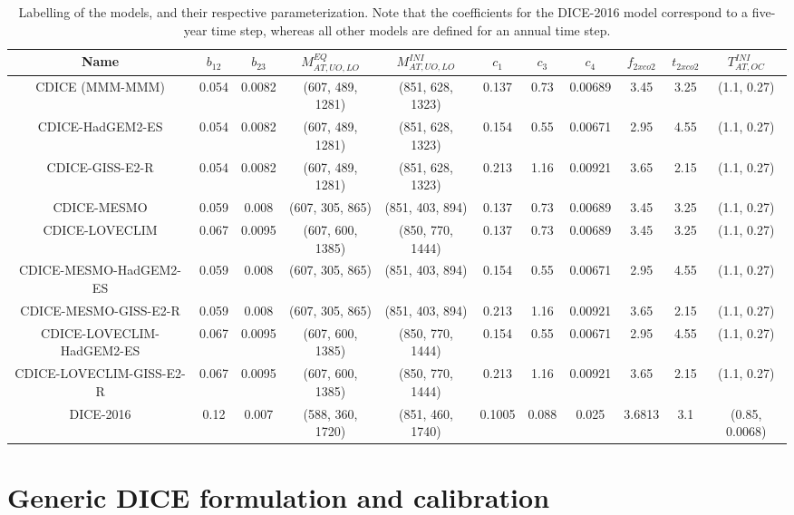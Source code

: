 \documentclass[11pt, a4paper, pdftex, twoside, dvipsnames]{article}
\begin{document}
\begin{appendices}
\begin{table}[H]
\centering
\resizebox{\textwidth}{!}
{\begin{tabular}{ c c c c c c c c c c c  } 
 \toprule
 Name & $b_{12}$  & $b_{23}$ & $M^{EQ}_{AT,UO,LO}$ & $M^{INI}_{AT,UO,LO}$ & $c_1$ & $c_3$ & $c_4$ & $f_{2xco2}$ & $t_{2xco2}$ & $T^{INI}_{AT,OC}$ \\ 
 \midrule
 CDICE (MMM-MMM) & 0.054 & 0.0082 & (607, 489, 1281) & (851, 628, 1323) & 0.137 & 0.73 & 0.00689 & 3.45 & 3.25 & (1.1, 0.27)  \\ 
 CDICE-HadGEM2-ES & 0.054 & 0.0082 & (607, 489, 1281) & (851, 628, 1323) & 0.154 & 0.55 & 0.00671 & 2.95 & 4.55 & (1.1, 0.27) \\ 
 CDICE-GISS-E2-R & 0.054 & 0.0082 & (607, 489, 1281) & (851, 628, 1323) & 0.213 & 1.16& 0.00921 & 3.65 & 2.15 & (1.1, 0.27) \\ 
 CDICE-MESMO & 0.059 & 0.008 & (607, 305, 865) & (851, 403, 894) & 0.137 & 0.73 & 0.00689 & 3.45 & 3.25 & (1.1, 0.27) \\
 CDICE-LOVECLIM & 0.067 & 0.0095 & (607, 600, 1385) & (850, 770, 1444) & 0.137 & 0.73 & 0.00689 & 3.45 & 3.25 & (1.1, 0.27)  \\
 CDICE-MESMO-HadGEM2-ES & 0.059 & 0.008 & (607, 305, 865) & (851, 403, 894) & 0.154 & 0.55 & 0.00671 & 2.95 & 4.55 & (1.1, 0.27)  \\
 CDICE-MESMO-GISS-E2-R & 0.059 & 0.008 & (607, 305, 865) & (851, 403, 894) & 0.213 & 1.16& 0.00921 & 3.65 & 2.15 & (1.1, 0.27) \\
 CDICE-LOVECLIM-HadGEM2-ES & 0.067 & 0.0095 & (607, 600, 1385) & (850, 770, 1444) & 0.154 & 0.55 & 0.00671 & 2.95 & 4.55 & (1.1, 0.27)  \\
 CDICE-LOVECLIM-GISS-E2-R & 0.067 & 0.0095 & (607, 600, 1385) & (850, 770, 1444) & 0.213 & 1.16& 0.00921 & 3.65 & 2.15 & (1.1, 0.27) \\
 DICE-2016 & 0.12 & 0.007 & (588, 360, 1720)& (851, 460, 1740) & 0.1005 & 0.088 & 0.025 & 3.6813 & 3.1 & (0.85, 0.0068)\\
 \bottomrule
\end{tabular}}
\caption{Labelling of the models, and their respective parameterization. Note that the coefficients for the DICE-2016 model correspond to a five-year time step, whereas all other models are defined for an annual time step.}
\label{table:model_calibration}
\end{table}  
  
  
\section{Generic DICE formulation and calibration}
\label{sec:generic}


\end{appendices}
\end{document}
